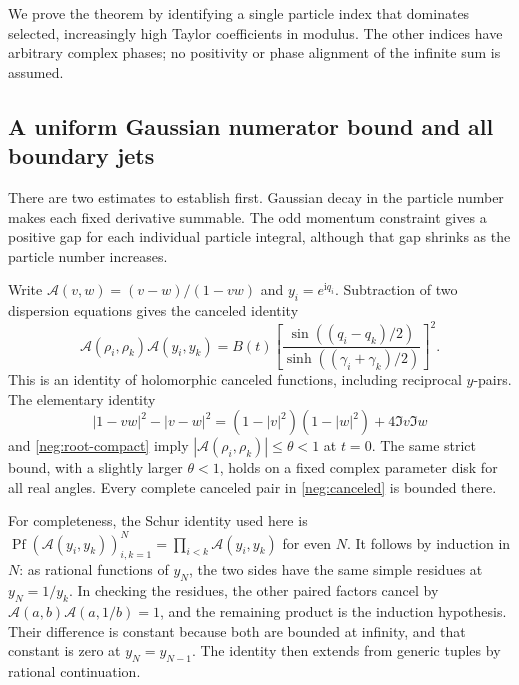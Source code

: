 \documentclass[11pt]{article}
\numberwithin{equation}{section}
\theoremstyle{definition}
\newcommand{\ii}{\mathrm i}
\begin{document}
We prove the theorem by identifying a single particle index that
dominates selected, increasingly high Taylor coefficients in modulus.
The other indices have arbitrary complex phases; no positivity or
phase alignment of the infinite sum is assumed.

\subsection{A uniform Gaussian numerator bound and all boundary jets}
\label{neg:jets-section}

There are two estimates to establish first. Gaussian decay in the
particle number makes each fixed derivative summable. The odd
momentum constraint gives a positive gap for each individual particle
integral, although that gap shrinks as the particle number increases.

Write \(\mathcal A(v,w)=(v-w)/(1-vw)\) and \(y_i=e^{\ii q_i}\).
Subtraction of two dispersion equations gives the canceled identity
\begin{equation}
 \mathcal A(\rho_i,\rho_k)\mathcal A(y_i,y_k)
 =B(t)\left[
    \frac{\sin((q_i-q_k)/2)}
         {\sinh((\gamma_i+\gamma_k)/2)}
       \right]^2 .
 \label{neg:canceled}
\end{equation}
This is an identity of holomorphic canceled functions, including
reciprocal \(y\)-pairs.  The elementary identity
\begin{equation}
 |1-vw|^2-|v-w|^2
 =(1-|v|^2)(1-|w|^2)+4\Im v\Im w
 \label{neg:schur}
\end{equation}
and \eqref{neg:root-compact} imply
\(|\mathcal A(\rho_i,\rho_k)|\le\theta<1\) at \(t=0\).
The same strict bound, with a slightly larger \(\theta<1\), holds
on a fixed complex parameter disk for all real angles.  Every
complete canceled pair in \eqref{neg:canceled} is bounded there.

For completeness, the Schur identity used here is
\(\operatorname{Pf}(\mathcal A(y_i,y_k))_{i,k=1}^{N}
=\prod_{i<k}\mathcal A(y_i,y_k)\) for even \(N\).
It follows by induction in \(N\): as rational functions of \(y_N\),
the two sides have the same simple residues at \(y_N=1/y_k\).
In checking the residues, the other paired factors cancel by
\(\mathcal A(a,b)\mathcal A(a,1/b)=1\), and the remaining product
is the induction hypothesis.  Their difference is constant because
both are bounded at infinity, and that constant is zero at
\(y_N=y_{N-1}\).  The identity then extends from generic tuples
by rational continuation.
\end{document}
